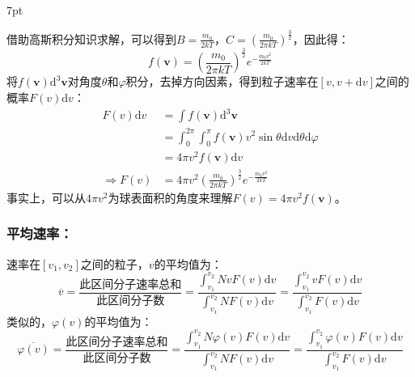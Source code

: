 \documentclass[zihao=5,UTF8]{report}
\newenvironment{graybox}{%
\def\FrameCommand{%
\hspace{1pt}%
{\color{gray}\small \vrule width 2pt}%
{\color{graybox_color}\vrule width 4pt}%
\colorbox{graybox_color}%
}%
\MakeFramed{\advance\hsize-\width\FrameRestore}%
\noindent\hspace{-4.55pt}%
\begin{adjustwidth}{}{7pt}%
\vspace{2pt}\vspace{2pt}%
}
{%
\vspace{2pt}\end{adjustwidth}\endMakeFramed%
}
\begin{document}
\begin{graybox}
    借助高斯积分知识求解，可以得到$B = \frac{m_0}{2kT}$，$C = \left(\frac{m_0}{2\pi kT}\right)^{\frac{3}{2}}$，因此得：
    \begin{equation}
        f(\boldsymbol{v}) = \left(\frac{m_0}{2\pi kT}\right)^{\frac{3}{2}}e^{-\frac{m_0v^2}{2kT}}
    \end{equation}
    将$f(\boldsymbol{v})\mathrm{d}^3\boldsymbol{v}$对角度$\theta$和$\varphi$积分，去掉方向因素，得到粒子速率在$[v,v+\mathrm{d}v]$之间的概率$F(v)\mathrm{d }v$：
    \begin{align*}
        F(v)\mathrm{d}v &= \int f(\boldsymbol{v})\mathrm{d}^3\boldsymbol{v} \\
        &= \int_{0}^{2\pi } \int_{0}^{\pi }  f(\boldsymbol{v})v^2\sin \theta  \mathrm{d}v\mathrm{d}\theta\mathrm{d}\varphi\\
        & = 4\pi v^2 f(\boldsymbol{v})\mathrm{d}v \\
        \Longrightarrow  F(v) & = 4\pi v^2\left(\frac{m_0}{2\pi kT}\right)^{\frac{3}{2}}e^{-\frac{m_0v^2}{2kT}}
    \end{align*}
事实上，可以从$4\pi v^2$为球表面积的角度来理解$F(v) = 4\pi v^2 f(\boldsymbol{v})$。
\end{graybox}  
\subsubsection{平均速率：}
速率在$[v_1,v_2]$之间的粒子，$v$的平均值为：
\begin{equation}
    \overline{v} = \frac{\text{此区间分子速率总和}}{\text{此区间分子数}} = \frac{\int_{v_1}^{v_2}NvF(v)\mathrm{d}v }{\int_{v_1}^{v_2}NF(v)\mathrm{d}v} = \frac{\int_{v_1}^{v_2}vF(v)\mathrm{d}v }{\int_{v_1}^{v_2}F(v)\mathrm{d}v}
\end{equation}
类似的，$\varphi(v)$的平均值为：
\begin{equation}
    \overline{\varphi(v)} = \frac{\text{此区间分子速率总和}}{\text{此区间分子数}} = \frac{\int_{v_1}^{v_2}N\varphi(v)F(v)\mathrm{d}v }{\int_{v_1}^{v_2}NF(v)\mathrm{d}v} = \frac{\int_{v_1}^{v_2}\varphi(v)F(v)\mathrm{d}v }{\int_{v_1}^{v_2}F(v)\mathrm{d}v}
\end{equation}
\end{document}
